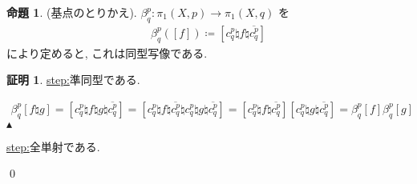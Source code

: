 \documentclass[10pt, fleqn, label-section=none]{bxjsarticle}
\theoremstyle{definition}
\newtheorem{prop}[dfn]{命題}
\newtheorem*{pf*}{証明}
\newcommand{\id}{\textrm{id}}
\renewcommand{\;}{\, ; \,}
\newenvironment{claim}[1]{\par\noindent\underline{step:}\space#1}{}
\newenvironment{claimproof}[1]{\par\noindent{($\because$)}\space#1}{\hfill $\blacktriangle $}
\begin{document}
\begin{prop}(基点のとりかえ). $\beta_q^p : \pi_1 (X, p) \rightarrow \pi_1 (X, q)$ を
\begin{align*} \beta_q^p ([f]) \coloneqq [ c_q^p \natural f \natural \overline{c_q^p} ]\end{align*}
により定めると, これは同型写像である.
\end{prop}
\begin{pf*}

\begin{claim}
準同型である. 
\end{claim}
\begin{claimproof}
\begin{align*} \beta_q^p[f \natural g] = [ c_q^p \natural f \natural g \natural \overline{c_q^p} ] =
[ c_q^p \natural f \natural \overline{c_q^p} \natural c_q^p \natural g \natural \overline{c_q^p} ] =
[ c_q^p \natural f \natural \overline{c_q^p} ]  [c_q^p \natural g \natural \overline{c_q^p} ] = 
\beta_q^p [f ] \beta_q^p[g]
 \end{align*}
\end{claimproof}

\begin{claim}
全単射である. 
\end{claim}

\qed
\end{pf*}
\end{document}
